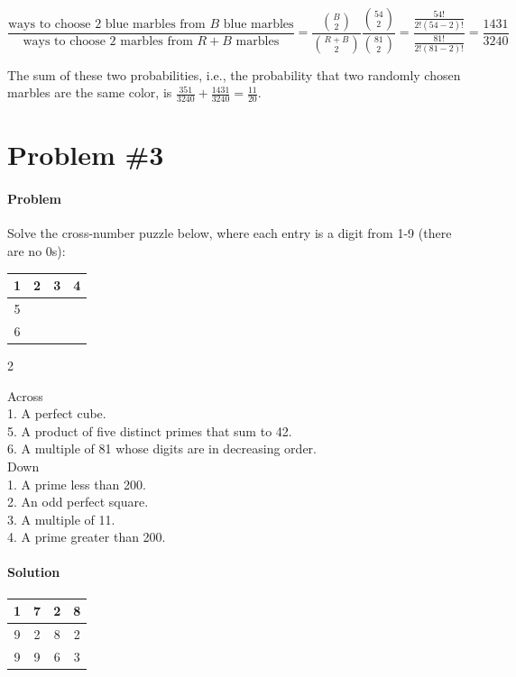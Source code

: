 \documentclass[10pt]{article}
\theoremstyle{plain}
\theoremstyle{definition}
\theoremstyle{remark}
\begin{document}
\[\frac{\text{ways to choose 2 blue marbles from \(B\) blue marbles}}{\text{ways to choose 2 marbles from \(R+B\) marbles}}=\frac{\binom{B}{2}}{\binom{R+B}{2}}\frac{\binom{54}{2}}{\binom{81}{2}}=\frac{\frac{54!}{2!(54-2)!}}{\frac{81!}{2!(81-2)!}}=\frac{1431}{3240}\]

The sum of these two probabilities, i.e., the probability that two randomly chosen marbles are the same color, is \(\frac{351}{3240}+\frac{1431}{3240}=\boxed{\frac{11}{20}}\).

\section{Problem \#3}

\paragraph{Problem} Solve the cross-number puzzle below, where each entry is a digit from 1-9 (there are no 0s):

\begin{center}
\begin{tabular}{ |c|c|c|c| } 
 \hline
1 & 2 & 3 & 4 \\ 
\hline
5 &&& \\ 
\hline
6 &&& \\ 
 \hline
\end{tabular}
\end{center}

\begin{multicols}{2}

Across \\ 
1. A perfect cube. \\ 
5. A product of five distinct primes that sum to 42. \\ 
6. A multiple of 81 whose digits are in decreasing order. \\ 
Down \\
1. A prime less than 200. \\
2. An odd perfect square. \\
3. A multiple of 11. \\
4. A prime greater than 200.

\end{multicols}

\paragraph{Solution}

\begin{center}
\begin{tabular}{ |c|c|c|c| } 
 \hline
1 & 7 & 2 & 8 \\ 
\hline
9 & 2 & 8 & 2 \\ 
\hline
9 & 9 & 6 & 3 \\ 
 \hline
\end{tabular}
\end{center}\
\end{document}
